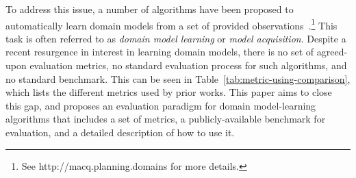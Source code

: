 \documentclass[letterpaper]{article} %
\newif\ifaddcomments
\newcommand{\roni}[1]{\ifaddcomments{\textcolor{red}{[Roni: #1]}}\fi}
\newcommand{\yarin}[1]{\ifaddcomments{\textcolor{teal}{[Yarin: #1]}}\fi}
\newcommand{\cm}[1]{\ifaddcomments{\textcolor{olive}{[Christian: #1]}}\fi}
\begin{document}
To address this issue, a number of algorithms have been proposed to automatically learn domain models from a set of provided observations~\citep{macq,aineto2019learning,jimenez2012review}.\footnote{See http://macq.planning.domains for more details.} 
This task is often referred to as \emph{domain model learning} or \emph{model acquisition}. %
Despite a recent resurgence in interest in learning domain models, there is 
no set of agreed-upon evaluation metrics, 
no standard evaluation process for such algorithms, 
and no standard benchmark. 
This can be seen in Table~\ref{tab:metric-using-comparison}, which lists the different metrics used by prior works. 
This paper aims to close this gap, and proposes an evaluation paradigm for domain model-learning algorithms that includes a set of metrics, a publicly-available benchmark for evaluation, and a detailed description of how to use it. 
\end{document}
